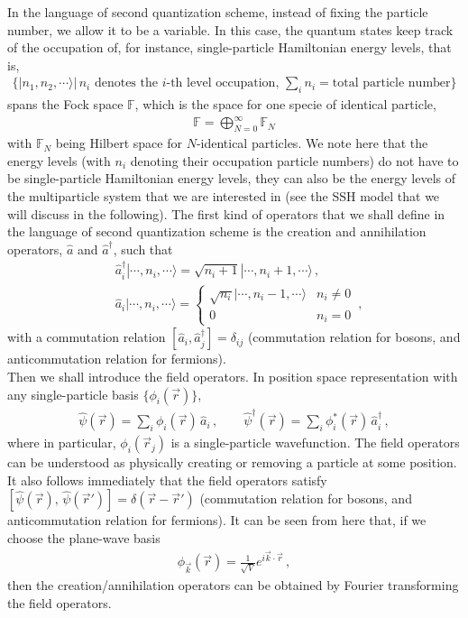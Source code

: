 \documentclass[11pt, onesided]{book}
\theoremstyle{break}
\theoremstyle{break}
\begin{document}
In the language of second quantization scheme, instead of fixing the particle number, we allow it to be a variable. 	In this case, the quantum states keep track of the occupation of, for instance, single-particle Hamiltonian energy levels, that is, 
\begin{align*}
\{|n_1, n_2, \cdots\rangle| \, n_i \text{ denotes the $i$-th level occupation, }\sum_i n_i = \text{total particle number}\}
\end{align*}
spans the Fock space $\mathbb{F}$, which is the space for one specie of identical particle, 
\begin{align*}
\mathbb{F} = \bigoplus_{N=0}^\infty \mathbb{F}_N
\end{align*}
with $\mathbb{F}_N$ being Hilbert space for $N$-identical particles. We note here that the energy levels (with $n_i$ denoting their occupation particle numbers) do not have to be single-particle Hamiltonian energy levels, they can also be the energy levels of the multiparticle system that we are interested in (see the SSH model that we will discuss in the following). The first kind of operators that we shall define in the language of second quantization scheme is the creation and annihilation operators, $\hat{a}$ and $\hat{a}^\dagger$, such that 
\begin{align*}
&\hat{a}^\dagger_i|\cdots, n_i, \cdots\rangle = \sqrt{n_i+1}|\cdots, n_i+1,\cdots\rangle\,,\\
&\hat{a}_i | \cdots, n_i, \cdots\rangle = \begin{cases}
\sqrt{n_i}| \cdots, n_i-1,\cdots\rangle & n_i \neq 0\\
0 & n_i =0 \end{cases} \,,
\end{align*}
with a commutation relation $[\hat{a}_i, \hat{a}_j^\dagger] = \delta_{ij}$ (commutation relation for bosons, and anticommutation relation for fermions). \\

Then we shall introduce the field operators. In position space representation with any single-particle basis $\{\phi_i (\vec{r})\}$,
\begin{align*}
\hat{\psi}(\vec{r}) =\sum_i \phi_i(\vec{r}) \, \hat{a}_i \,,\qquad
\hat{\psi}^\dagger(\vec{r}) = \sum_i \phi_i^*(\vec{r}) \, \hat{a}^\dagger_i\,,
\end{align*}
where in particular, $\phi_i(\vec{r}_j)$ is a single-particle wavefunction. The field operators can be understood as physically creating or removing a particle at some position. It also follows immediately that the field operators satisfy $[\hat{\psi}(\vec{r}),\, \hat{\psi}(\vec{r}') ] = \delta(\vec{r}-\vec{r}')$ (commutation relation for bosons, and anticommutation relation for fermions). It can be seen from here that, if we choose the plane-wave basis
\begin{align*}
\phi_{\vec{k}}(\vec{r}) = \frac{1}{\sqrt{V}} e^{i\vec{k}\cdot \vec{r}}\,,
\end{align*}
then the creation/annihilation operators can be obtained by Fourier transforming the field operators.\\
\end{document}
